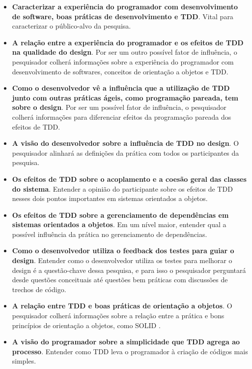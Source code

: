 \begin{itemize}
	\item \textbf{Caracterizar a experiência do programador com desenvolvimento de
	software, boas práticas de desenvolvimento e TDD}. Vital para caracterizar o
	público-alvo da pesquisa.

	\item \textbf{A relação entre a experiência do programador e os efeitos de TDD
	na qualidade do design}. Por ser um outro possível fator de influência, o
	pesquisador colherá informações sobre a experiência do programador com
	desenvolvimento de softwares, conceitos de orientação a objetos e TDD. 

	\item \textbf{Como o desenvolvedor vê a influência que a utilização de TDD
	junto com outras práticas ágeis, como programação pareada, tem sobre o design}.
	Por ser um possível fator de influência, o pesquisador colherá informações para
	diferenciar efeitos da programação pareada dos efeitos de TDD.

	\item \textbf{A visão do desenvolvedor sobre a influência de TDD no design}.
	O pesquisador alinhará as definições da prática com todos os participantes da
	pesquisa.

	\item \textbf{Os efeitos de TDD sobre o acoplamento e a coesão geral das
	classes do sistema}. Entender a opinião do participante sobre os efeitos de TDD
	nesses dois pontos importantes em sistemas orientados a objetos. 

 	\item \textbf{Os efeitos de TDD sobre a gerenciamento de dependências em
 	sistemas orientados a objetos}. Em um nível maior, entender qual a possível
 	influência da prática no gerenciamento de dependências.
	
	\item \textbf{Como o desenvolvedor utiliza o feedback dos testes para guiar o
	design}. Entender como o desenvolvedor utiliza os testes para melhorar o design
	é a questão-chave dessa pesquisa, e para isso o pesquisador perguntará desde
	questões conceituais até questões bem práticas com discussões de trechos de
	código.

	\item \textbf{A relação entre TDD e boas práticas de orientação a objetos}.
	O pesquisador colherá informações sobre a relação entre a prática e
	bons princípios de orientação a objetos, como SOLID \cite{bob-martin}.

	\item \textbf{A visão do programador sobre a simplicidade que TDD agrega ao
	processo}. Entender como TDD leva o programador à criação de códigos mais
	simples.

\end{itemize} 

